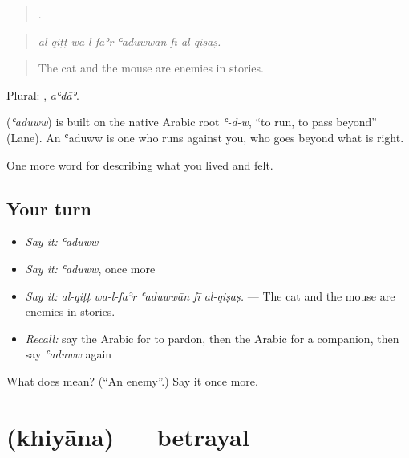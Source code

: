 \begin{quote}
    .
\end{quote}

\begin{quote}
\emph{al-qiṭṭ wa-l-faʾr ʿaduwwān fī al-qiṣaṣ.}
\end{quote}

\begin{quote}
The cat and the mouse are enemies in stories.
\end{quote}

Plural: , \emph{aʿdāʾ}.

\begin{cousinweb}
\textbf{} (\emph{ʿaduww}) is built on the native Arabic root \emph{ʿ-d-w}, \textquotedblleft{}to run, to pass beyond\textquotedblright{} (Lane). An ʿaduww is one who runs against you, who goes beyond what is right.
\end{cousinweb}

\begin{grammarlens}[title={What you've built}]
One more word for describing what you lived and felt.
\end{grammarlens}

\subsection*{Your turn}
\begin{itemize}
\raggedright
  \item \emph{Say it:} \emph{ʿaduww}
  \item \emph{Say it:} \emph{ʿaduww}, once more
  \item \emph{Say it:} \emph{al-qiṭṭ wa-l-faʾr ʿaduwwān fī al-qiṣaṣ.} — The cat and the mouse are enemies in stories.
  \item \emph{Recall:} say the Arabic for to pardon, then the Arabic for a companion, then say \emph{ʿaduww} again
\end{itemize}

\begin{tcolorbox}[breakable,colback=teal!4,colframe=teal!35!black,title={Before you move on}]
What does  mean? (\textquotedblleft{}An enemy\textquotedblright{}.) Say it once more.
\end{tcolorbox}
\section[\texorpdfstring{\ar{خيانة} (khiyāna)}{خيانة (khiyāna)}]{ (khiyāna) — betrayal}


